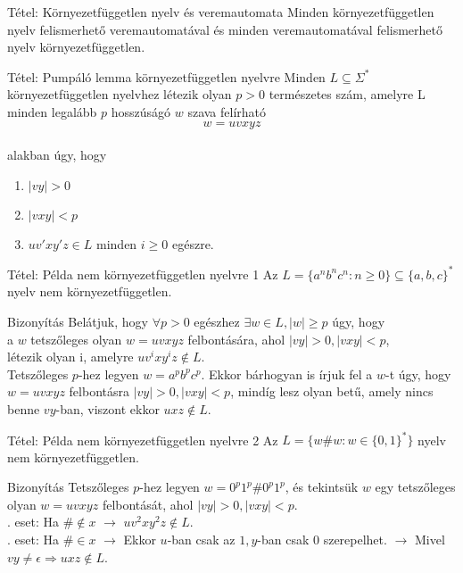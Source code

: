 \documentclass{beamer}
\begin{document}
\begin{frame}
\begin{block}{Tétel: Környezetfüggetlen nyelv és veremautomata}
Minden környezetfüggetlen nyelv felismerhető veremautomatával és minden veremautomatával felismerhető nyelv környezetfüggetlen.
\end{block}

\begin{block}{Tétel: Pumpáló lemma környezetfüggetlen nyelvre}
Minden $L \subseteq {\Sigma}^*$ környezetfüggetlen nyelvhez létezik olyan $p > 0$ természetes szám, amelyre L minden legalább $p$ hosszúságó $w$ szava felírható $$w = uvxyz$$\\
alakban úgy, hogy\\
\begin{enumerate}
\item $|vy| > 0$
\item $|vxy| < p$
\item $uv'xy'z \in L$ minden $i \geq 0$ egészre.
\end{enumerate}

\end{block}
\end{frame}

\begin{frame}
\begin{block}{Tétel: Példa nem környezetfüggetlen nyelvre 1}
Az $L = \{a^nb^nc^n : n \geq 0 \} \subseteq \{a, b, c\}^*$ nyelv nem környezetfüggetlen.
\end{block}

\begin{block}{Bizonyítás}
Belátjuk, hogy ${\forall}p > 0$ egészhez ${\exists}w \in L, |w| \geq p$ úgy, hogy\\
a $w$ tetszőleges olyan $w = uvxyz$ felbontására, ahol $|vy| > 0, |vxy| < p$,\\
létezik olyan i, amelyre $uv^ixy^iz \notin L$.\\
\bigskip
Tetszőleges $p$-hez legyen $w = a^pb^pc^p$. Ekkor bárhogyan is írjuk fel a $w$-t úgy, hogy $w = uvxyz$ felbontásra $|vy| > 0, |vxy| < p$, mindíg lesz olyan betű, amely nincs benne $vy$-ban, viszont ekkor $uxz \notin L$.
\end{block}
\end{frame}

\begin{frame}
\begin{block}{Tétel: Példa nem környezetfüggetlen nyelvre 2}
Az $L = \{w\#w : w \in \{0, 1\}^* \}$ nyelv nem környezetfüggetlen.
\end{block}

\begin{block}{Bizonyítás}
Tetszőleges $p$-hez legyen $w = 0^p1^p\#0^p1^p$, és tekintsük $w$ egy tetszőleges olyan $w = uvxyz$ felbontását, ahol $|vy| > 0, |vxy| < p$.\\
. eset: Ha $\# \notin x$ $\rightarrow$ $uv^2xy^2z \notin L$.\\
. eset: Ha $\# \in x$ $\rightarrow$ Ekkor $u$-ban csak az $1, y$-ban csak $0$ szerepelhet. $\rightarrow$ Mivel $vy \neq \epsilon \Rightarrow uxz \notin L$.
\end{block}
\end{frame}
\end{document}
